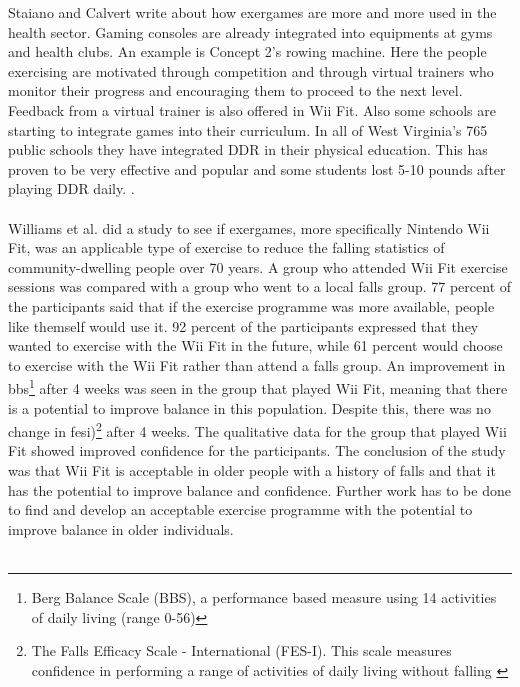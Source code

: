 Staiano and Calvert write about how exergames are more and more used in the health sector. Gaming consoles are already integrated into equipments at gyms and health clubs. An example is Concept 2’s rowing machine. Here the people exercising are motivated through competition and through virtual trainers who monitor their progress and encouraging them to proceed to the next level. Feedback from a virtual trainer is also offered in Wii Fit. Also some schools are starting to integrate games into their curriculum. In all of West Virginia’s 765 public schools they have integrated DDR in their physical education. This has proven to be very effective and popular and some students lost 5-10 pounds after playing DDR daily. \cite{staiano2011exergames}. \\ \\
Williams et al. did a study to see if exergames, more specifically Nintendo Wii Fit, was an applicable type of exercise to reduce the falling statistics of community-dwelling people over 70 years. A group who attended Wii Fit exercise sessions was compared with a group who went to a local falls group. 77 percent of the participants said that if the exercise programme was more available, people like themself would use it. 92 percent of the participants expressed that they wanted to exercise with the Wii Fit in the future, while 61 percent would choose to exercise with the Wii Fit rather than attend a falls group. An improvement in \ac{bbs}\footnote{Berg Balance Scale (BBS), a performance based measure using 14 activities of daily living (range 0-56)\cite{excell}} after 4 weeks was seen in the group that played Wii Fit, meaning that there is a potential to improve balance in this population. Despite this, there was no change in \ac{fesi})\footnote{The Falls Efficacy Scale - International (FES-I). This scale measures confidence in performing a range of activities of daily living without falling \cite{fes}} after 4 weeks. The qualitative data for the group that played Wii Fit showed improved confidence for the participants. The conclusion of the study was that Wii Fit is acceptable in  older people with a history of falls and that it has the potential to improve balance and confidence. Further work has to be done to find and develop an acceptable exercise programme with the potential to improve balance in older individuals. \cite{excell}\\ \\
